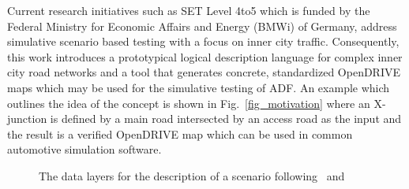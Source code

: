 \documentclass[a4paper, 10pt, conference]{ieeeconf}      %
\begin{document}
Current research initiatives such as SET Level 4to5 which is funded by the Federal Ministry for Economic Affairs and Energy (BMWi) of Germany, address simulative scenario based testing with a focus on inner city traffic. Consequently, this work introduces a prototypical logical description language for complex inner city road networks and a tool that generates concrete, standardized OpenDRIVE maps which may be used for the simulative testing of ADF. An example which outlines the idea of the concept is shown in Fig.~\ref{fig_motivation} where an X-junction is defined by a main road intersected by an access road as the input and the result is a verified OpenDRIVE map which can be used in common automotive simulation software.

\begin{figure}[t]
	\caption{The data layers for the description of a scenario following~\cite{bock2018data} and~\cite{bagschik2018ontology}}
	\label{fig_layers}
\end{figure}
\end{document}
